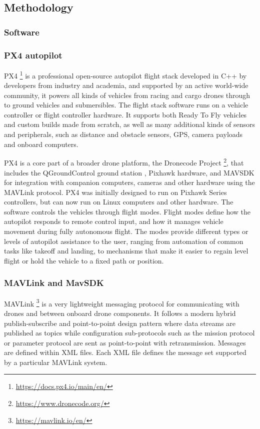 \subsection{Methodology}

\subsubsection{Software}

\subsubsection{PX4 autopilot}
\label{subsec:px4}
PX4 \footnote{\url{https://docs.px4.io/main/en/}} is a professional open-source autopilot flight stack developed in C++ by developers from industry and academia, and supported by an active world-wide community,
it powers all kinds of vehicles from racing and cargo drones through to ground vehicles and submersibles.
The flight stack software runs on a vehicle controller or flight controller hardware. It supports both Ready To Fly vehicles and custom builds made from scratch,
as well as many additional kinds of sensors and peripherals, such as distance and obstacle sensors, GPS, camera payloads and onboard computers.

PX4 is a core part of a broader drone platform, the Dronecode Project \footnote{\url{https://www.dronecode.org/}}, that includes the QGroundControl ground station , Pixhawk hardware,
and MAVSDK for integration with companion computers, cameras and other hardware using the MAVLink protocol.
PX4 was initially designed to run on Pixhawk Series controllers, but can now run on Linux computers and other hardware.
The software controls the vehicles through flight modes. 
Flight modes define how the autopilot responds to remote control input, and how it manages vehicle movement during fully autonomous flight.
The modes provide different types or levels of autopilot assistance to the user, ranging from automation of common tasks like takeoff and landing, 
to mechanisms that make it easier to regain level flight or hold the vehicle to a fixed path or position.

\subsubsection{MAVLink and MavSDK}
\label{subsec:mavlink}
MAVLink \footnote{\url{https://mavlink.io/en/}} is a very lightweight messaging protocol for communicating with drones and between onboard drone components. 
It follows a modern hybrid publish-subscribe and point-to-point design pattern 
where data streams are published as topics while configuration sub-protocols 
such as the mission protocol or parameter protocol are sent as point-to-point with retransmission. 
Messages are defined within XML files. 
Each XML file defines the message set supported by a particular MAVLink system.

